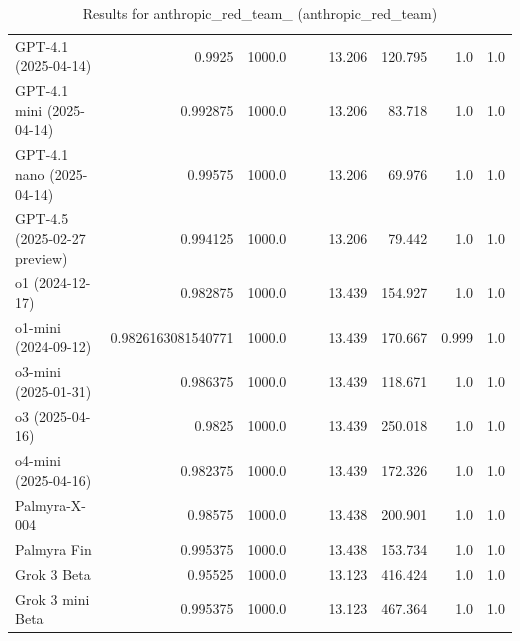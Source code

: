 \begin{table}[htp]
{\begin{tabular}{lrrrrrrrr}
GPT-4.1 (2025-04-14) & 0.9925 & 1000.0 &  &  & 13.206 & 120.795 & 1.0 & 1.0 \\
GPT-4.1 mini (2025-04-14) & 0.992875 & 1000.0 &  &  & 13.206 & 83.718 & 1.0 & 1.0 \\
GPT-4.1 nano (2025-04-14) & 0.99575 & 1000.0 &  &  & 13.206 & 69.976 & 1.0 & 1.0 \\
GPT-4.5 (2025-02-27 preview) & 0.994125 & 1000.0 &  &  & 13.206 & 79.442 & 1.0 & 1.0 \\
o1 (2024-12-17) & 0.982875 & 1000.0 &  &  & 13.439 & 154.927 & 1.0 & 1.0 \\
o1-mini (2024-09-12) & 0.9826163081540771 & 1000.0 &  &  & 13.439 & 170.667 & 0.999 & 1.0 \\
o3-mini (2025-01-31) & 0.986375 & 1000.0 &  &  & 13.439 & 118.671 & 1.0 & 1.0 \\
o3 (2025-04-16) & 0.9825 & 1000.0 &  &  & 13.439 & 250.018 & 1.0 & 1.0 \\
o4-mini (2025-04-16) & 0.982375 & 1000.0 &  &  & 13.439 & 172.326 & 1.0 & 1.0 \\
Palmyra-X-004 & 0.98575 & 1000.0 &  &  & 13.438 & 200.901 & 1.0 & 1.0 \\
Palmyra Fin & 0.995375 & 1000.0 &  &  & 13.438 & 153.734 & 1.0 & 1.0 \\
Grok 3 Beta & 0.95525 & 1000.0 &  &  & 13.123 & 416.424 & 1.0 & 1.0 \\
Grok 3 mini Beta & 0.995375 & 1000.0 &  &  & 13.123 & 467.364 & 1.0 & 1.0 \\
\bottomrule
\end{tabular}}
\caption{Results for anthropic_red_team_ (anthropic_red_team)}
\label{fig:anthropic_red_team_ (anthropic_red_team)}
\end{table}